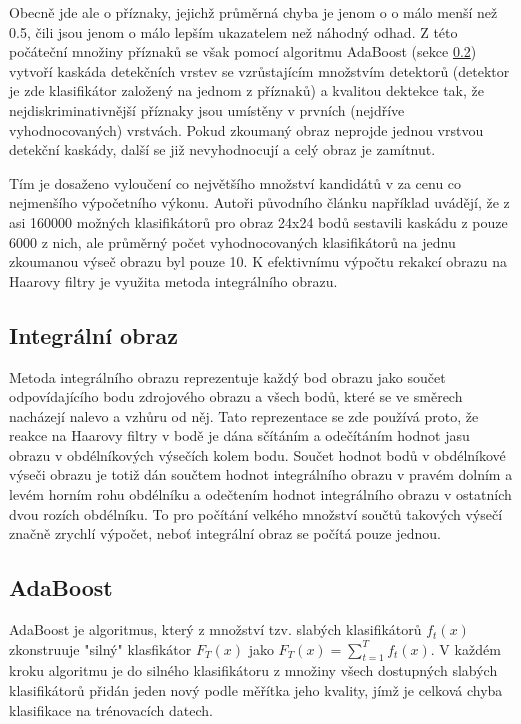 	Obecně jde ale o příznaky, jejichž průměrná chyba je jenom o o málo menší než 0.5, čili jsou jenom o málo lepším ukazatelem než náhodný odhad. Z této počáteční množiny příznaků se však pomocí algoritmu AdaBoost (sekce \ref{subsec_adaboost}) vytvoří kaskáda detekčních vrstev se vzrůstajícím množstvím detektorů (detektor je zde klasifikátor založený na jednom z příznaků) a kvalitou dektekce tak, že nejdiskriminativnější příznaky jsou umístěny v prvních (nejdříve vyhodnocovaných) vrstvách. Pokud zkoumaný obraz neprojde jednou vrstvou detekční kaskády, další se již nevyhodnocují a celý obraz je zamítnut. 
	
	Tím je dosaženo vyloučení co největšího množství kandidátů v za cenu co nejmenšího výpočetního výkonu. Autoři původního článku například uvádějí, že z asi 160000 možných klasifikátorů pro obraz 24x24 bodů sestavili kaskádu z pouze 6000 z nich, ale průměrný počet vyhodnocovaných klasifikátorů na jednu zkoumanou výseč obrazu byl pouze 10. K efektivnímu výpočtu rekakcí obrazu na Haarovy filtry je využita metoda integrálního obrazu.
	
\subsection{Integrální obraz}
	Metoda integrálního obrazu reprezentuje každý bod obrazu jako součet odpovídajícího bodu zdrojového obrazu a všech bodů, které se ve směrech nacházejí nalevo a vzhůru od něj. Tato reprezentace se zde používá proto, že reakce na Haarovy filtry v bodě je dána sčítáním a odečítáním hodnot jasu obrazu v obdélníkových výsečích kolem bodu. Součet hodnot bodů v obdélníkové výseči obrazu je totiž dán součtem hodnot integrálního obrazu v pravém dolním a levém horním rohu obdélníku a odečtením hodnot integrálního obrazu v ostatních dvou rozích obdélníku. To pro počítání velkého množství součtů takových výsečí značně zrychlí výpočet, neboť integrální obraz se počítá pouze jednou.
	
\subsection{AdaBoost}
\label{subsec_adaboost}

	AdaBoost je algoritmus, který z množství tzv. slabých klasifikátorů $f_t(x)$ zkonstruuje "silný" klasfikátor $F_T(x)$ jako $F_T(x) = \sum_{t=1}^{T} f_t(x)$. V každém kroku algoritmu je do silného klasifikátoru z množiny všech dostupných slabých klasifikátorů přidán jeden nový podle měřítka jeho kvality, jímž je celková chyba klasifikace na trénovacích datech. 
	
